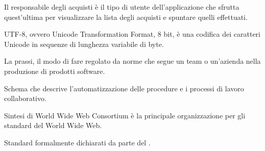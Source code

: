 Il responsabile degli acquisti è il tipo di utente dell’applicazione che sfrutta quest’ultima per visualizzare la lista degli acquisti e spuntare quelli effettuati.

UTF-8, ovvero Unicode Transformation Format, 8 bit, è una codifica dei caratteri Unicode in sequenze di lunghezza variabile di byte.
\clearpage

La prassi, il modo di fare regolato da norme che segue un team o un'azienda nella produzione di prodotti software.

Schema che descrive l’automatizzazione delle procedure e i processi di lavoro collaborativo.

Sintesi di World Wide Web Consortium \`e la principale organizzazione per gli standard del World Wide Web.

Standard formalmente dichiarati da parte del .
\clearpage


